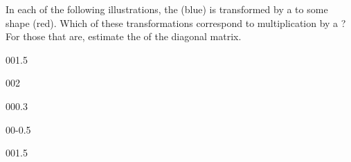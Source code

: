 \begin{exercise} \label{ex:} 
In each of the following illustrations, the  (blue) is transformed by a  to some shape (red).
Which of these transformations correspond to multiplication by a ?  
For those that are, estimate the  of the diagonal matrix.
\begin{parts}
\item {}

\item {}00{1.5}

\item {}00{2}

\item {}00{0.3}

\item {}

\item {}

\item {}00{-0.5}

\item {}

\item {}00{1.5}

\item {}

\end{parts}
\end{exercise}



